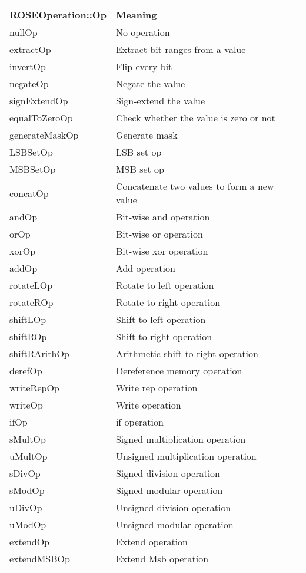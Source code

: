 \begin{center}
\begin{tabular}{ll}
\toprule
ROSEOperation::Op & Meaning \\
\midrule
    nullOp  & No operation \\
    extractOp & Extract bit ranges from a value \\
    invertOp & Flip every bit \\
    negateOp & Negate the value \\
    signExtendOp & Sign-extend the value \\
    equalToZeroOp & Check whether the value is zero or not \\
    generateMaskOp & Generate mask \\
    LSBSetOp & LSB set op\\
    MSBSetOp & MSB set op \\
    concatOp & Concatenate two values to form a new value \\
    andOp & Bit-wise and operation \\
    orOp & Bit-wise or operation \\
    xorOp & Bit-wise xor operation \\
    addOp & Add operation \\
    rotateLOp & Rotate to left operation \\
    rotateROp & Rotate to right operation \\
    shiftLOp & Shift to left operation \\
    shiftROp & Shift to right operation \\
    shiftRArithOp & Arithmetic shift to right operation \\
    derefOp  & Dereference memory operation \\
    writeRepOp & Write rep operation\\
    writeOp & Write operation\\
    ifOp & if operation \\
    sMultOp & Signed multiplication operation \\
    uMultOp & Unsigned multiplication operation \\
    sDivOp & Signed division operation \\
    sModOp & Signed modular operation \\
    uDivOp & Unsigned division operation \\    
    uModOp & Unsigned modular operation \\
    extendOp & Extend operation \\
    extendMSBOp & Extend Msb operation \\
\bottomrule
\end{tabular}
\end{center}

